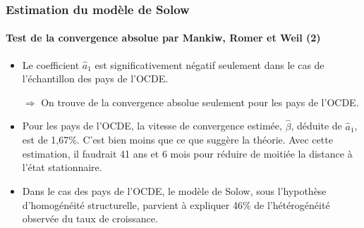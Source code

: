 \documentclass[10pt,notheorems]{beamer}
\theoremstyle{plain}
\theoremstyle{definition} %
\begin{document}
\begin{frame}
  \frametitle{Estimation du modèle de Solow}
  \framesubtitle{Test de la convergence absolue par Mankiw, Romer et Weil (2)}

  \begin{itemize}

  \item Le coefficient $\hat a_1$ est significativement négatif seulement dans le cas de l'échantillon des pays de l'OCDE.\newline

  \item[$\Rightarrow$] On trouve de la convergence absolue seulement pour les pays de l'OCDE.\newline

  \item Pour les pays de l'OCDE, la vitesse de convergence estimée, $\hat\beta$,
    déduite de $\hat a_1$, est de 1,67\%. C'est bien moins que ce que suggère la
    théorie. Avec cette estimation, il faudrait 41 ans et 6 mois pour réduire de
    moitiée la distance à l'état stationnaire.\newline

  \item Dans le cas des pays de l'OCDE, le modèle de Solow, sous l'hypothèse
    d'homogénéité structurelle, parvient à expliquer 46\% de l'hétérogénéité
    observée du taux de croissance.

  \end{itemize}

\end{frame}
\end{document}
